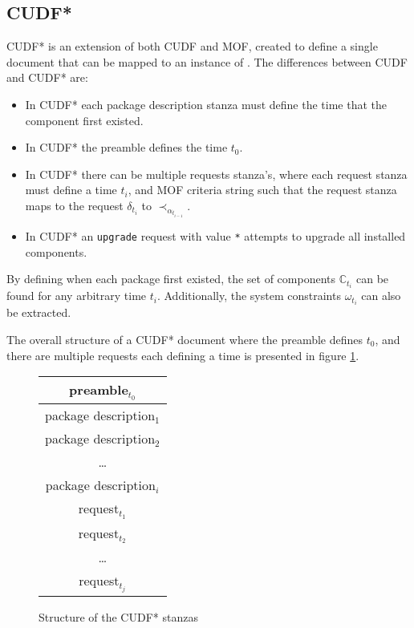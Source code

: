 \subsection{CUDF*}
\label{formal.cudfstar}
CUDF* is an extension of both CUDF and MOF, created to define a single document that can be mapped to an instance of \modelname.
The differences between CUDF and CUDF* are:
\begin{itemize}
  \item In CUDF* each package description stanza must define the time that the component first existed.
  \item In CUDF* the preamble defines the time $t_0$. 
  \item In CUDF* there can be multiple requests stanza's, where each request stanza must define a time $t_i$, and MOF criteria string
  such that the request stanza maps to the request $\delta_{t_i}$ to $\prec_{\alpha_{t_{i-1}}}$.
  \item In CUDF* an \texttt{upgrade} request with value \texttt{*} attempts to upgrade all installed components.
\end{itemize}

By defining when each package first existed, the set of components $\mathbb{C}_{t_i}$ can be found for any arbitrary time $t_i$.
Additionally, the system constraints $\omega_{t_i}$ can also be extracted.

The overall structure of a CUDF* document where the preamble defines $t_0$, and there are multiple requests each defining a time is presented in figure \ref{formal.cudfstarstruct}.
\begin{figure}[htp]
\centering
\begin{tabular}{|c|}
\hline preamble$_{t_0}$ \\ \hline
\hline package description$_{1}$ \\ \hline
\hline package description$_{2}$ \\ \hline
 \multicolumn{1}{c}{\ldots}  \\ 
\hline package description$_{i}$\\ \hline
\hline request$_{t_1}$\\ \hline
\hline request$_{t_2}$\\ \hline
\multicolumn{1}{c}{\ldots}  \\
\hline request$_{t_j}$\\ \hline
\end{tabular}
\caption{Structure of the CUDF* stanzas}
\label{formal.cudfstarstruct}
\end{figure}

